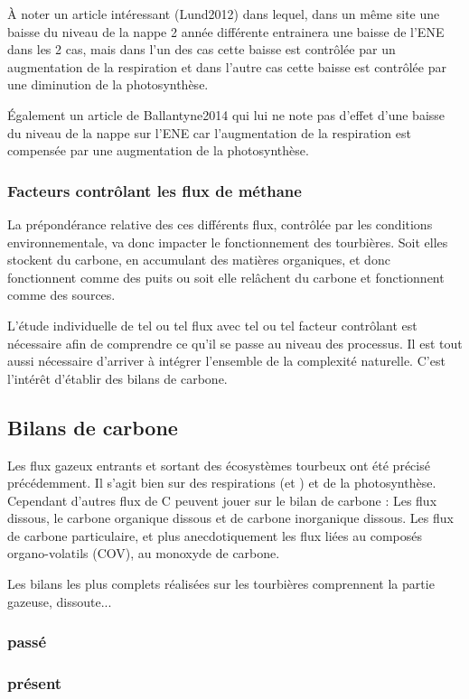 À noter un article intéressant (Lund2012) dans lequel, dans un même site une baisse du niveau de la nappe 2 année différente entrainera une baisse de l'ENE dans les 2 cas, mais dans l'un des cas cette baisse est contrôlée par un augmentation de la respiration et dans l'autre cas cette baisse est contrôlée par une diminution de la photosynthèse.

Également un article de Ballantyne2014 qui lui ne note pas d'effet d'une baisse du niveau de la nappe sur l'ENE car l'augmentation de la respiration est compensée par une augmentation de la photosynthèse.

\subsubsection{Facteurs contrôlant les flux de méthane}




La prépondérance relative des ces différents flux, contrôlée par les conditions environnementale, va donc impacter le fonctionnement des tourbières. 
Soit elles stockent du carbone, en accumulant des matières organiques, et donc fonctionnent comme des puits ou soit elle relâchent du carbone et fonctionnent comme des sources.


L'étude individuelle de tel ou tel flux avec tel ou tel facteur contrôlant est nécessaire afin de comprendre ce qu'il se passe au niveau des processus.
Il est tout aussi nécessaire d'arriver à intégrer l'ensemble de la complexité naturelle.
C'est l'intérêt d'établir des bilans de carbone.

\subsection{Bilans de carbone}

Les flux gazeux entrants et sortant des écosystèmes tourbeux ont été précisé précédemment.
Il s'agit bien sur des respirations (\COO et \CHH) et de la photosynthèse.
Cependant d'autres flux de C peuvent jouer sur le bilan de carbone : 
Les flux dissous, le carbone organique dissous et de carbone inorganique dissous.
Les flux de carbone particulaire, et plus anecdotiquement les flux liées au composés organo-volatils (COV), au monoxyde de carbone.

Les bilans les plus complets réalisées sur les tourbières comprennent la partie gazeuse, dissoute...

\subsubsection{passé}

\subsubsection{présent}


